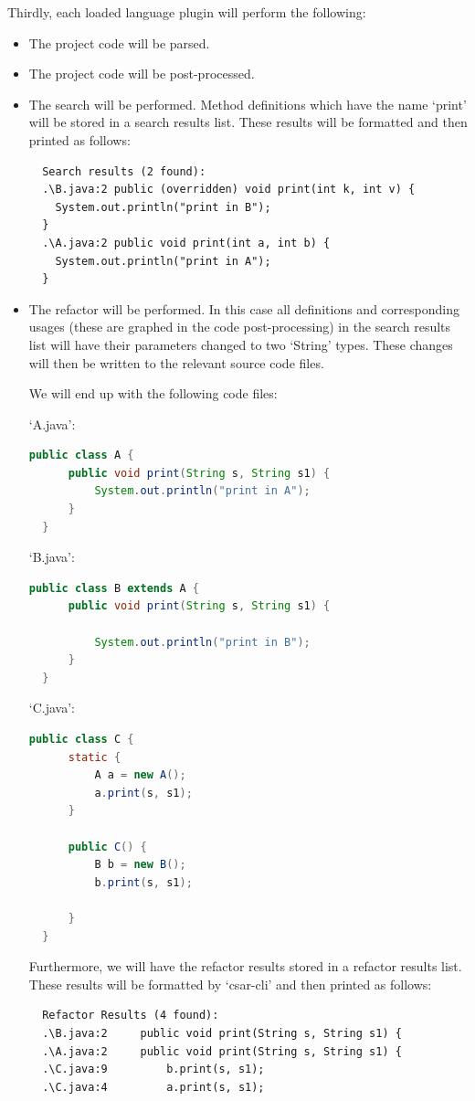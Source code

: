 \documentclass[12pt, letterpaper]{article}
\begin{document}
Thirdly, each loaded language plugin will perform the following:
\begin{itemize}
  \item The project code will be parsed.
  \item The project code will be post-processed.
  \item The search will be performed.
  Method definitions which have the name `print' will be stored in a search results list.
  These results will be formatted and then printed as follows:
  \begin{lstlisting}
  Search results (2 found):
  .\B.java:2 public (overridden) void print(int k, int v) {
    System.out.println("print in B");
  }
  .\A.java:2 public void print(int a, int b) {
    System.out.println("print in A");
  }
  \end{lstlisting}
  \item The refactor will be performed.
  In this case all definitions and corresponding usages (these are graphed in the code post-processing) in the search results list will have their parameters changed to two `String' types.
  These changes will then be written to the relevant source code files.
  
  We will end up with the following code files:

  `A.java':
  \begin{lstlisting}[language=Java]
  public class A {
      public void print(String s, String s1) {
          System.out.println("print in A");
      }
  }
  \end{lstlisting}

  `B.java':
  \begin{lstlisting}[language=Java]
  public class B extends A {
      public void print(String s, String s1) {

          System.out.println("print in B");
      }
  }
  \end{lstlisting}

  `C.java':
  \begin{lstlisting}[language=Java]
  public class C {
      static {
          A a = new A();
          a.print(s, s1);
      }
      
      public C() {
          B b = new B();
          b.print(s, s1);

      }
  }
  \end{lstlisting}
  
  Furthermore, we will have the refactor results stored in a refactor results list.
  These results will be formatted by `csar-cli' and then printed as follows:
  \begin{lstlisting}
  Refactor Results (4 found):
  .\B.java:2     public void print(String s, String s1) {
  .\A.java:2     public void print(String s, String s1) {
  .\C.java:9         b.print(s, s1);
  .\C.java:4         a.print(s, s1);
  \end{lstlisting}
\end{itemize}
\end{document}
